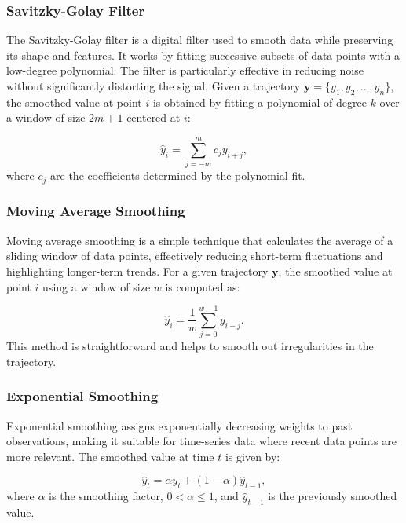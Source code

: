 \documentclass[12pt,oneside]{book} %
\begin{document}
\subsubsection*{Savitzky-Golay Filter}

\noindent The Savitzky-Golay filter is a digital filter used to smooth data while
preserving its shape and features. It works by fitting successive subsets of
data points with a low-degree polynomial. The filter is particularly effective
in reducing noise without significantly distorting the signal. Given a
trajectory $\mathbf{y} = \{y_1, y_2, \ldots, y_n\}$, the smoothed value at
point $i$ is obtained by fitting a polynomial of degree $k$ over a window of
size $2m + 1$ centered at $i$:

\begin{equation}
    \hat{y}_i = \sum_{j=-m}^{m} c_j y_{i+j},
\end{equation}
where $c_j$ are the coefficients determined by the polynomial fit.

\subsubsection*{Moving Average Smoothing}

\noindent Moving average smoothing is a simple technique that calculates the average of a
sliding window of data points, effectively reducing short-term fluctuations and
highlighting longer-term trends. For a given trajectory $\mathbf{y}$, the
smoothed value at point $i$ using a window of size $w$ is computed as:

\begin{equation}
    \hat{y}_i = \frac{1}{w} \sum_{j=0}^{w-1} y_{i-j}.
\end{equation}
This method is straightforward and helps to smooth out irregularities in the
trajectory.

\subsubsection*{Exponential Smoothing}

\noindent Exponential smoothing assigns exponentially decreasing weights to past
observations, making it suitable for time-series data where recent data points
are more relevant. The smoothed value at time $t$ is given by:

\begin{equation}
    \hat{y}_t = \alpha y_t + (1 - \alpha) \hat{y}_{t-1},
\end{equation}
where $\alpha$ is the smoothing factor, $0 < \alpha \leq 1$, and
$\hat{y}_{t-1}$ is the previously smoothed value.
\end{document}
